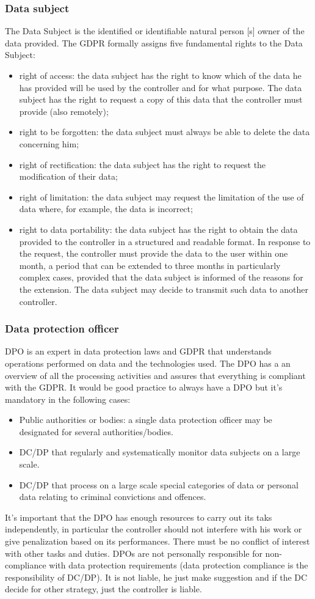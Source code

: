 \subsubsection{Data subject}
The Data Subject is the identified or identifiable natural person [s] owner of the data provided. The GDPR formally assigns five fundamental rights to the Data Subject:
\begin{itemize}
    \item right of access: the data subject has the right to know which of the data he has provided will be used by the controller and for what purpose. The data subject has the right to request a copy of this data that the controller must provide (also remotely);
    \item right to be forgotten: the data subject must always be able to delete the data concerning him;
    \item right of rectification: the data subject has the right to request the modification of their data;
    \item right of limitation: the data subject may request the limitation of the use of data where, for example, the data is incorrect;
    \item right to data portability: the data subject has the right to obtain the data provided to the controller in a structured and readable format. In response to the request, the controller must provide the data to the user within one month, a period that can be extended to three months in particularly complex cases, provided that the data subject is informed of the reasons for the extension. The data subject may decide to transmit such data to another controller.
\end{itemize}
\subsubsection{Data protection officer}
DPO is an expert in data protection laws and GDPR that understands operations performed on data and the technologies used. The DPO has a an overview of all the processing activities and assures that everything is compliant with the GDPR. It would be good practice to always have a DPO but it's mandatory in the following cases:
\begin{itemize}
    \item Public authorities or bodies: a single data protection officer may be designated for several authorities/bodies.
    \item  DC/DP that regularly and systematically monitor data subjects on a large scale.
    \item  DC/DP that process on a large scale special categories of data or personal data relating to criminal convictions and offences.
\end{itemize}
It's important that the DPO has enough resources to carry out its taks independently, in particular the controller should not interfere with his work or give penalization based on its performances. There must be no conflict of interest with other tasks and duties.
DPOs are not personally responsible for non-compliance with data protection requirements (data protection compliance is the responsibility of DC/DP). It is not liable, he just make suggestion and if the DC decide for other strategy, just the controller is liable.
